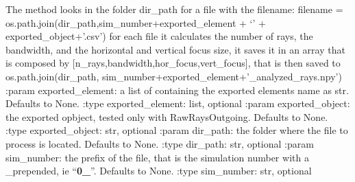 \documentclass[letterpaper,10pt,english]{sphinxmanual}
\begin{document}
\begin{fulllineitems}
\begin{fulllineitems}
\label{\detokenize{index:raypyng.postprocessing.PostProcess.postprocess_RawRays}}
\pysigstartsignatures
{}
\pysigstopsignatures
\sphinxAtStartPar
The method looks in the folder dir\_path for a file with the filename:
filename = os.path.join(dir\_path,sim\_number+exported\_element + ‘\sphinxhyphen{}’ + exported\_object+’.csv’)
for each file it calculates the number of rays, the bandwidth, and the horizontal and vertical focus size,
it saves it in an array that is composed by {[}n\_rays,bandwidth,hor\_focus,vert\_focus{]}, that is then saved to
os.path.join(dir\_path, sim\_number+exported\_element+’\_analyzed\_rays.npy’)
:param exported\_element: a list of containing the exported elements name as str. Defaults to None.
:type exported\_element: list, optional
:param exported\_object: the exported opbject, tested only with RawRaysOutgoing. Defaults to None.
:type exported\_object: str, optional
:param dir\_path: the folder where the file to process is located. Defaults to None.
:type dir\_path: str, optional
:param sim\_number: the prefix of the file, that is the simulation number with a \_prepended, ie “{\color{red}\bfseries{}0\_}”. Defaults to None.
:type sim\_number: str, optional

\end{fulllineitems}


\end{fulllineitems}




\renewcommand{\indexname}{Index}
\printindex
\end{document}
